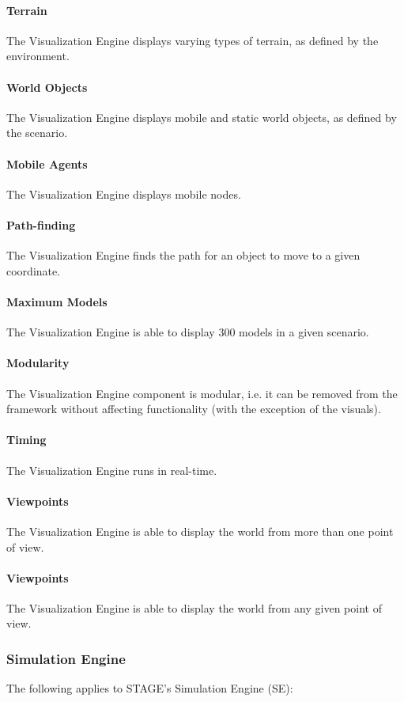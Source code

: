 \documentclass[titlepage]{article}
\begin{document}
    \paragraph{Terrain} The Visualization Engine displays varying types of terrain, as defined by the environment.
    \paragraph{World Objects} The Visualization Engine displays mobile and static world objects, as defined by the scenario.
    \paragraph{Mobile Agents} The Visualization Engine displays mobile nodes.
    \paragraph{Path-finding} The Visualization Engine finds the path for an object to move to a given coordinate.
    \paragraph{Maximum Models} The Visualization Engine is able to display 300 models in a given scenario.
    \paragraph{Modularity} The Visualization Engine component is modular, i.e. it can be removed from the framework without affecting functionality (with the exception of the visuals).
    \paragraph{Timing} The Visualization Engine runs in real-time.
    \paragraph{Viewpoints} The Visualization Engine is able to display the world from more than one point of view.
    \paragraph{Viewpoints} The Visualization Engine is able to display the world from any given point of view.

\subsubsection{Simulation Engine}
	The following applies to STAGE's Simulation Engine (SE):
\end{document}
